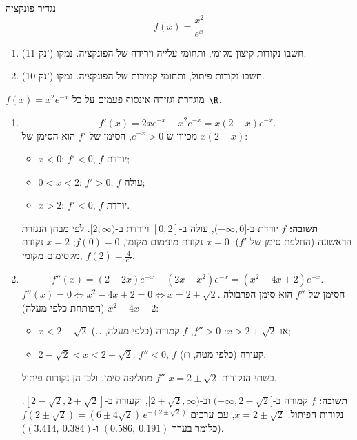 
\begin{question}
נגדיר פונקציה
\[ f(x) = \frac{x^2}{e^x} \]
\begin{enumerate}
  \item (11 נק') חשבו נקודות קיצון מקומי, ותחומי עלייה וירידה של הפונקציה. נמקו.
  \item (10 נק') חשבו נקודות פיתול, ותחומי קמירות של הפונקציה. נמקו.
\end{enumerate}
\end{question}

\begin{solution}
$f(x) = x^2e^{-x}$ מוגדרת וגזירה אינסוף פעמים על כל $\R$.
\begin{enumerate}
  \item
  \[ f'(x) = 2xe^{-x} - x^2e^{-x} = x(2 - x)e^{-x}. \]
  מכיוון ש-$e^{-x} > 0$, הסימן של $f'$ הוא הסימן של $x(2-x)$:
  \begin{itemize}
    \item $x < 0$: $f' < 0$, $f$ יורדת;
    \item $0 < x < 2$: $f' > 0$, $f$ עולה;
    \item $x > 2$: $f' < 0$, $f$ יורדת.
  \end{itemize}
  \textbf{תשובה:} $f$ יורדת ב-$(-\infty,0]$, עולה ב-$[0,2]$ ויורדת ב-$[2,\infty)$.
  לפי מבחן הנגזרת הראשונה (החלפת סימן של $f'$): $x = 0$ נקודת מינימום מקומי, $f(0) = 0$; $x = 2$ נקודת מקסימום מקומי, $f(2) = \frac{4}{e^2}$.

  \item
  \[ f''(x) = (2 - 2x)e^{-x} - (2x - x^2)e^{-x} = (x^2 - 4x + 2)e^{-x}. \]
  $f''(x) = 0 \iff x^2 - 4x + 2 = 0 \iff x = 2 \pm \sqrt{2}$. הסימן של $f''$ הוא סימן הפרבולה $x^2 - 4x + 2$ (הפותחת כלפי מעלה):
  \begin{itemize}
    \item $x < 2 - \sqrt2$ או $x > 2+\sqrt2$: $f'' > 0$, $f$ קמורה (כלפי מעלה, $\cup$);
    \item $2-\sqrt2 < x < 2 + \sqrt 2$: $f'' < 0$, $f$ קעורה (כלפי מטה, $\cap$).
  \end{itemize}
  בשתי הנקודות $x = 2\pm\sqrt2$ $f''$ מחליפה סימן, ולכן הן נקודות פיתול.

  \textbf{תשובה:} $f$ קמורה ב-$(-\infty, 2 - \sqrt2]$ וב-$[2+\sqrt2, \infty)$, וקעורה ב-$[2-\sqrt2, 2+\sqrt2]$.
  נקודות הפיתול: $x = 2 \pm \sqrt2$, עם ערכים $f(2\pm\sqrt2) = (6 \pm 4\sqrt2)\,e^{-(2\pm\sqrt2)}$
  (כלומר בערך $(0.586,\ 0.191)$ ו-$(3.414,\ 0.384)$).
\end{enumerate}
\end{solution}
